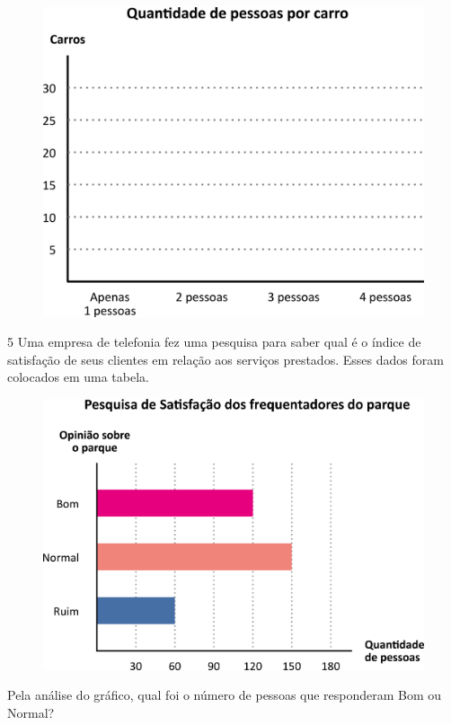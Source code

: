 \begin{figure}[htpb!]
\centering
\includegraphics[width=\textwidth]{./media/image81.png}
\end{figure}

\num{5} Uma empresa de telefonia fez uma pesquisa para saber qual é o índice de
satisfação de seus clientes em relação aos serviços prestados. Esses dados foram
colocados em uma tabela.

\begin{figure}[htpb!]
\centering
\includegraphics[width=.8\textwidth]{./media/image82.png}
\end{figure}

Pela análise do gráfico, qual foi o número de pessoas que
responderam Bom ou Normal? 

